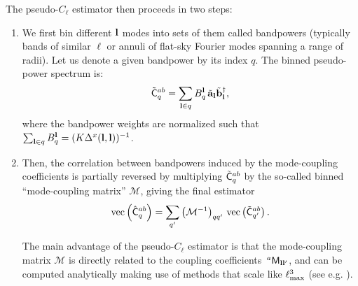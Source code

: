 \documentclass[a4paper,11pt]{article}
\begin{document}
      The pseudo-$C_\ell$ estimator then proceeds in two steps:
      \begin{enumerate}
        \item We first bin different ${\bf l}$ modes into sets of them called bandpowers (typically bands of similar $\ell$ or annuli of flat-sky Fourier modes spanning a range of radii). Let us denote a given bandpower by its index $q$. The binned pseudo-power spectrum is:
        \begin{equation}\label{eq:bandpowers}
          \tilde{\sf C}^{ab}_q=\sum_{{\bf l}\in q} B_q^{\bf l}\,\tilde{\bf a}_{\bf l}\tilde{\bf b}^\dag_{\bf l},
        \end{equation}
        where the bandpower weights are normalized such that $\sum_{{\bf l}\in q}B_q^{\bf l}=(K\Delta^x({\bf l},{\bf l}))^{-1}$.
        \item Then, the correlation between bandpowers induced by the mode-coupling coefficients is partially reversed by multiplying $\tilde{\sf C}^{ab}_q$ by the so-called binned ``mode-coupling matrix'' $\mathcal{M}$, giving the final estimator
        \begin{equation}
          {\rm vec}\left(\hat{\sf C}^{ab}_q\right) = \sum_{q'} \left(\mathcal{M}^{-1}\right)_{qq'}\,{\rm vec}\left(\tilde{\sf C}^{ab}_{q'}\right).
        \end{equation}

        The main advantage of the pseudo-$C_\ell$ estimator is that the mode-coupling matrix $\mathcal{M}$ is directly related to the coupling coefficients $\,^a{\sf M}_{{\bf l}{\bf l}'}$, and can be computed analytically making use of methods that scale like $\ell_{\rm max}^3$ (see e.g. \cite{2002ApJ...567....2H}).
      \end{enumerate}
    
\end{document}
